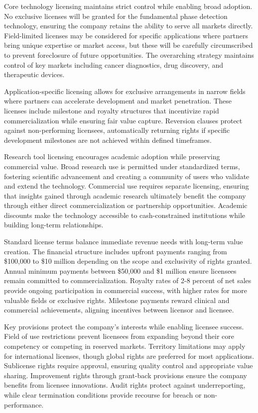 \documentclass[12pt,a4paper]{report}
\begin{document}
Core technology licensing maintains strict control while enabling broad adoption. No exclusive licenses will be granted for the fundamental phase detection technology, ensuring the company retains the ability to serve all markets directly. Field-limited licenses may be considered for specific applications where partners bring unique expertise or market access, but these will be carefully circumscribed to prevent foreclosure of future opportunities. The overarching strategy maintains control of key markets including cancer diagnostics, drug discovery, and therapeutic devices.

Application-specific licensing allows for exclusive arrangements in narrow fields where partners can accelerate development and market penetration. These licenses include milestone and royalty structures that incentivize rapid commercialization while ensuring fair value capture. Reversion clauses protect against non-performing licensees, automatically returning rights if specific development milestones are not achieved within defined timeframes.

Research tool licensing encourages academic adoption while preserving commercial value. Broad research use is permitted under standardized terms, fostering scientific advancement and creating a community of users who validate and extend the technology. Commercial use requires separate licensing, ensuring that insights gained through academic research ultimately benefit the company through either direct commercialization or partnership opportunities. Academic discounts make the technology accessible to cash-constrained institutions while building long-term relationships.

Standard license terms balance immediate revenue needs with long-term value creation. The financial structure includes upfront payments ranging from \$100,000 to \$10 million depending on the scope and exclusivity of rights granted. Annual minimum payments between \$50,000 and \$1 million ensure licensees remain committed to commercialization. Royalty rates of 2-8 percent of net sales provide ongoing participation in commercial success, with higher rates for more valuable fields or exclusive rights. Milestone payments reward clinical and commercial achievements, aligning incentives between licensor and licensee.

Key provisions protect the company's interests while enabling licensee success. Field of use restrictions prevent licensees from expanding beyond their core competency or competing in reserved markets. Territory limitations may apply for international licenses, though global rights are preferred for most applications. Sublicense rights require approval, ensuring quality control and appropriate value sharing. Improvement rights through grant-back provisions ensure the company benefits from licensee innovations. Audit rights protect against underreporting, while clear termination conditions provide recourse for breach or non-performance.
\end{document}
